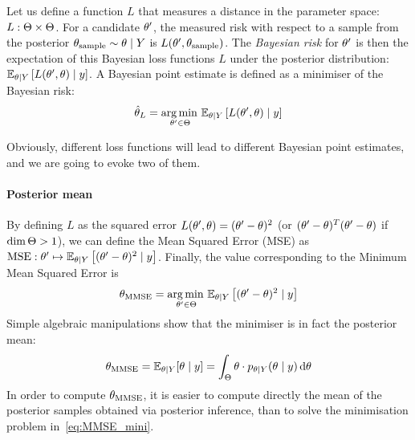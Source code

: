\documentclass[../../Main_ManuscritThese.tex]{subfiles}
\begin{document}
Let us define a function $L$ that measures a distance in the parameter
space: $L:\Theta\times \Theta$. For a candidate $\theta^{\prime}$, the
measured risk with respect to a sample from the posterior
$\theta_{\mathrm{sample}} \sim \theta \mid Y$ is
$L(\theta^{\prime}, \theta_{\mathrm{sample}})$.  The \emph{Bayesian
  risk} for $\theta^{\prime}$ is then the expectation of this Bayesian
loss functions $L$ under the posterior distribution:
$\mathbb{E}_{\theta\mid Y}\left[L(\theta^{\prime},\theta)\mid y\right]$. A
Bayesian point estimate is defined as a minimiser of the Bayesian
risk:
\begin{equation}
  \hat{\theta}_{L} = \operatorname*{arg\,min \,}_{\theta^{\prime} \in \Theta} \mathbb{E}_{\theta\mid Y}\left[L(\theta^{\prime}, \theta) \mid y\right]
\end{equation}

Obviously, different loss functions will lead to different Bayesian
point estimates, and we are going to evoke two of them.
\paragraph{Posterior mean}
By defining $L$ as the squared error
$L(\theta^{\prime}, \theta) = (\theta^{\prime} - \theta)^2$ (or $(\theta^{\prime} - \theta)^T(\theta^{\prime} - \theta)$ if $\dim \Theta > 1$), we can
define the Mean Squared Error (MSE) as
$\mathrm{MSE}: \theta^{\prime}\mapsto\mathbb{E}_{\theta\mid
  Y}\left[(\theta^{\prime} - \theta)^2 \mid y\right]$. Finally, the
value corresponding to the Minimum Mean Squared Error is
\begin{equation}
  \label{eq:MMSE_mini}
  {\theta}_{\mathrm{MMSE}} = \operatorname*{arg\,min \,}_{\theta^{\prime}\in\Theta}\mathbb{E}_{\theta\mid Y}\left[(\theta^{\prime} - \theta)^2 \mid  y\right]
\end{equation}
Simple algebraic manipulations show that the minimiser is in fact the posterior mean:
\begin{equation}
  \label{eq:def_MMSE}
  {\theta}_{\mathrm{MMSE}} = \mathbb{E}_{\theta\mid Y}[\theta \mid  y] = \int_{\Theta}\theta\cdot p_{\theta\mid Y}(\theta \mid  y)\,\mathrm{d}\theta
\end{equation}
In order to compute ${\theta}_{\mathrm{MMSE}}$, it is easier to compute
directly the mean of the posterior samples obtained via posterior
inference, than to solve the minimisation problem
in~\cref{eq:MMSE_mini}.
\end{document}
